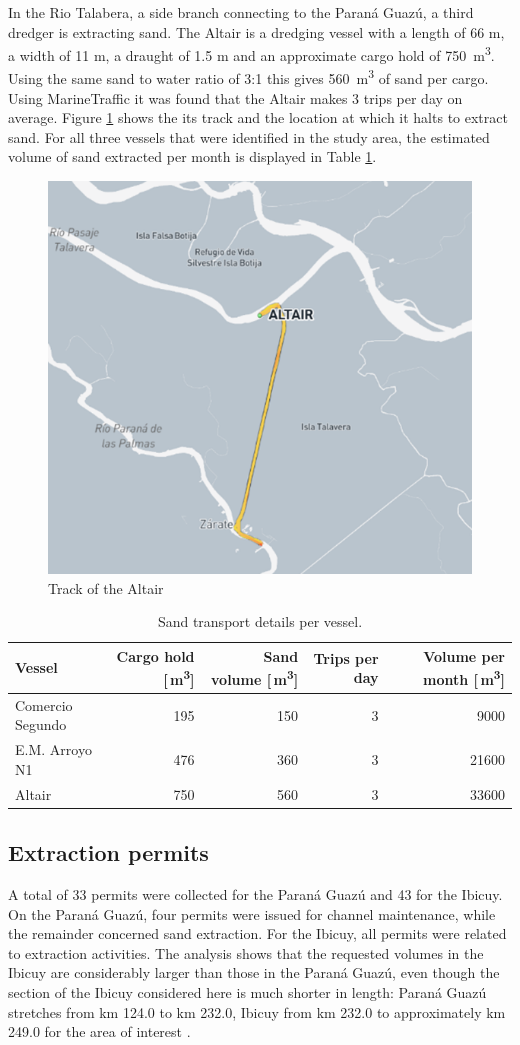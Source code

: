 In the Rio Talabera, a side branch connecting to the Paraná Guazú, a third dredger is extracting sand. The Altair is a dredging vessel with a length of 66 m, a width of 11 m, a draught of 1.5 m and an approximate cargo hold of 750 \,m\textsuperscript{3}. Using the same sand to water ratio of 3:1 this gives 560 \,m\textsuperscript{3} of sand per cargo. Using MarineTraffic it was found that the Altair makes 3 trips per day on average. Figure \ref{fig:Altair_track} shows the its track and the location at which it halts to extract sand. For all three vessels that were identified in the study area, the estimated volume of sand extracted per month is displayed in Table \ref{tab:sand_volume}.

\begin{figure}[H]
    \centering
    \includegraphics[width=0.5\linewidth]{figures/ch5/Track_Altair.png}
    \caption{Track of the Altair}
    \label{fig:Altair_track}
\end{figure}


\begin{table}[H]
\centering
\begin{tabular}{lrrrr}
\hline
Vessel & Cargo hold [\,m\textsuperscript{3}] & Sand volume [\,m\textsuperscript{3}] & Trips per day & Volume per month [\,m\textsuperscript{3}] \\
\hline
Comercio Segundo & 195 & 150 & 3 & 9000 \\
E.M. Arroyo N1 & 476 & 360 & 3 & 21600 \\
Altair & 750 & 560 & 3 & 33600 \\
\hline
\end{tabular}
\caption{Sand transport details per vessel.}
\label{tab:sand_volume}
\end{table}

\subsection{Extraction permits}
A total of 33 permits were collected for the Paraná Guazú and 43 for the Ibicuy. On the Paraná Guazú, four permits were issued for channel maintenance, while the remainder concerned sand extraction. For the Ibicuy, all permits were related to extraction activities. The analysis shows that the requested volumes in the Ibicuy are considerably larger than those in the Paraná Guazú, even though the section of the Ibicuy considered here is much shorter in length: Paraná Guazú stretches from km 124.0 to km 232.0, Ibicuy from km 232.0 to approximately km 249.0 for the area of interest \autocite{administraciongeneraldepuertoss.a.u.AGPComenzoBatimetria2023}.

